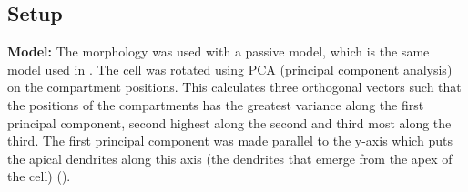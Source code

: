 \documentclass[altfont, fleqn]{uiophd}
\renewcommand{\cref}[1]{{\color{viridis_03}\mycref{#1}}}
\begin{document}
\subsection{Setup}
\label{sec:petter_setup}
\textbf{Model:}
The \textcite{mainen_influence_1996} morphology was used with a passive model, which is 
the same model used in \textcite{pettersen_amplitude_2008}. 
The cell was rotated using PCA (principal component analysis) on the compartment
positions.
This calculates three orthogonal vectors such that 
the positions of the compartments 
has the greatest variance along the first principal component, 
second highest along the second and third most along the third.
The first principal component was made parallel to the y-axis which
puts the apical dendrites 
along this axis
(the dendrites that emerge from the
apex of the cell) 
(\cref{fig:4_1_morph}).
\\
\end{document}
